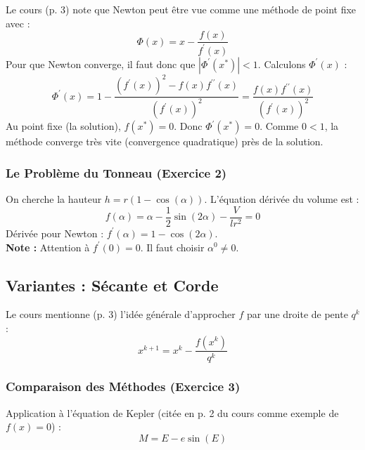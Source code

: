 Le cours (p. 3) note que Newton peut être vue comme une méthode de point fixe avec : 
\begin{equation*}
    \Phi(x)=x-\frac{f(x)}{f^{\prime}(x)} 
\end{equation*}
Pour que Newton converge, il faut donc que $|\Phi^{\prime}(x^{*})|<1$. Calculons $\Phi^{\prime}(x)$ : 
\begin{equation*}
    \Phi^{\prime}(x)=1-\frac{(f^{\prime}(x))^{2}-f(x)f^{\prime\prime}(x)}{(f^{\prime}(x))^{2}}=\frac{f(x)f^{\prime\prime}(x)}{(f^{\prime}(x))^{2}} 
\end{equation*}
Au point fixe (la solution), $f(x^{*})=0$. Donc $\Phi^{\prime}(x^{*})=0$. Comme $0<1$, la méthode converge très vite (convergence quadratique) près de la solution.

\subsubsection*{Le Problème du Tonneau (Exercice 2)} 

On cherche la hauteur $h=r(1-\cos(\alpha))$. L'équation dérivée du volume est : 
\begin{equation*}
    f(\alpha)=\alpha-\frac{1}{2}\sin(2\alpha)-\frac{V}{lr^{2}}=0 
\end{equation*}
Dérivée pour Newton : $f^{\prime}(\alpha)=1-\cos(2\alpha)$.\\
\textbf{Note :} Attention à $f^{\prime}(0)=0$. Il faut choisir $\alpha^{0}\neq0$.

\subsection{Variantes : Sécante et Corde} 

Le cours mentionne (p. 3) l'idée générale d'approcher $f$ par une droite de pente $q^{k}$ : 
\begin{equation*}
    x^{k+1}=x^{k}-\frac{f(x^{k})}{q^{k}} 
\end{equation*}

\subsubsection*{Comparaison des Méthodes (Exercice 3)} 

Application à l'équation de Kepler (citée en p. 2 du cours comme exemple de $f(x)=0$) : 
\begin{equation*}
    M=E-e\sin(E) 
\end{equation*}

